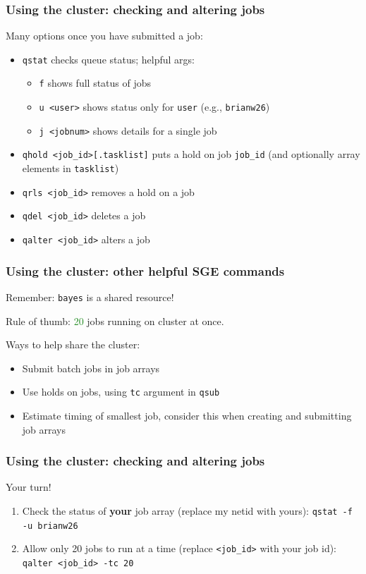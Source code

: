 \documentclass[12pt, 
hyperref={colorlinks=true, linkcolor=BlueViolet, urlcolor=BlueViolet},dvipsnames]{beamer}
\begin{document}
\begin{frame}
\frametitle{Using the cluster: checking and altering jobs}

Many options once you have submitted a job: \vspace{-0.3cm} \pause
\begin{itemize}
\item \texttt{qstat} checks queue status; \vspace{-0.1cm} \pause helpful args:
\begin{itemize}
\item \texttt{f} shows full status of jobs
\item \texttt{u <user>} shows status only for \texttt{user} (e.g., \texttt{brianw26})
\item \texttt{j <jobnum>} shows details for a single job 
\end{itemize} \pause
\item \texttt{qhold <job\_id>[.tasklist]} puts a hold on job \texttt{job\_id} (and optionally array elements in \texttt{tasklist}) \pause
\item \texttt{qrls <job\_id>} removes a hold on a job
\item \texttt{qdel <job\_id>} deletes a job
\item \texttt{qalter <job\_id>} alters a job 
\end{itemize}
\end{frame}

\begin{frame}
\frametitle{Using the cluster: other helpful SGE commands}

Remember: \texttt{bayes} is a shared resource! \pause

Rule of thumb: \textcolor{ForestGreen}{20} jobs running on cluster at once. \pause

Ways to help share the cluster: \vspace{-0.3cm} \pause
\begin{itemize}
\item Submit batch jobs in job arrays \pause
\item Use holds on jobs, using \texttt{tc} argument in \texttt{qsub} \pause
\item Estimate timing of smallest job, consider this when creating and submitting job arrays
\end{itemize}
\end{frame}

\begin{frame}
\frametitle{Using the cluster: checking and altering jobs}

Your turn!

\begin{enumerate}
\item Check the status of \textbf{your} job array (replace my netid with yours): \texttt{qstat -f -u brianw26}
\item Allow only 20 jobs to run at a time (replace \texttt{<job\_id>} with your job id): \texttt{qalter <job\_id> -tc 20}
\end{enumerate}
\end{frame}
\end{document}
